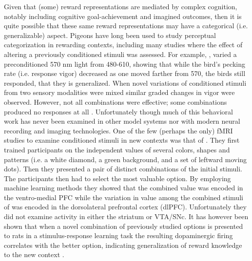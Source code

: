 \documentclass[doc,12pt]{apa}        %
\begin{document}
Given that (some) reward representations are mediated by complex cognition, notably including cognitive goal-achievement and imagined outcomes,  then it is quite possible that these same reward representations may have a categorical (i.e. generalizable) aspect.  Pigeons have long been used to study perceptual categorization in rewarding contexts, including many studies where the effect of altering a previously conditioned stimuli was assessed.  For example, , varied a preconditioned 570 nm light from 480-610, showing that while the bird's pecking rate (i.e. response vigor) decreased as one moved farther from 570, the birds still responded, that they is generalized.  When novel variations of conditioned stimuli from two sensory modalities were mixed similar graded changes in vigor were observed. However, not all combinations were effective; some combinations produced no responses at all \cite{Blough:2001p8408,Simmons:2008p8405,Urcuioli:2001p8359}.  Unfortunately though much of this behavioral work has never been examined in other model systems nor with modern neural recording and imaging technologies.  One of the few (perhaps the only) fMRI studies to examine conditioned stimuli in new contexts was that of . They first trained participants on the independent values of several colors, shapes and patterns (i.e. a white diamond, a green background, and a set of leftward moving dots).  Then they presented a pair of distinct combinations of the initial stimuli.  The participants then had to select the most valuable option.  By employing machine learning methods they showed that the combined value was encoded in the ventro-medial PFC while the variation in value among the combined stimuli of was encoded in the dorsolateral prefrontal cortex (dlPFC).  Unfortunately they did not examine activity in either the striatum or VTA/SNc.  It has however been shown that when a novel combination of previously studied options is presented to rats in a stimulus-response learning task the resulting dopaminergic firing correlates with the better option, indicating generalization of reward knowledge to the new context \cite{Roesch:2007p2519}.

\end{document}
